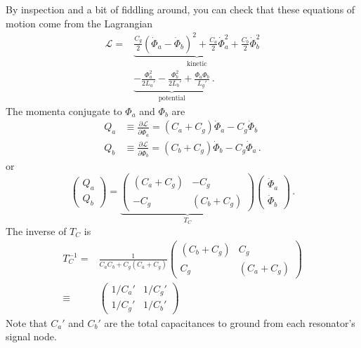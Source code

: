 \documentclass{article}
\begin{document}
By inspection and a bit of fiddling around, you can check that these equations of motion come from the Lagrangian
\begin{align}
  \mathcal{L}
  =& \underbrace{\frac{C_g}{2} \left(\dot \Phi_a - \dot \Phi_b \right)^2
   + \frac{C_a}{2} \dot \Phi_a^2 + \frac{C_b}{2} \dot \Phi_b^2}_\text{kinetic} \nonumber \\
  & \underbrace{- \frac{\Phi_a^2}{2 L_a'} - \frac{\Phi_b^2}{2 L_b'} + \frac{\Phi_a \Phi_b}{L_g'}}_\text{potential} \, .
\end{align}
The momenta conjugate to $\Phi_a$ and $\Phi_b$ are
\begin{align*}
  Q_a & \equiv \frac{\partial \mathcal{L}}{\partial \dot \Phi_a} = (C_a + C_g) \dot \Phi_a - C_g \dot \Phi_b \\
  Q_b & \equiv \frac{\partial \mathcal{L}}{\partial \dot \Phi_b} = (C_b + C_g) \dot \Phi_b - C_g \dot \Phi_a
  \, .
\end{align*}
or
\begin{equation*}
  \left( \begin{array}{c} Q_a \\ Q_b \end{array} \right)
  =
  \underbrace{
    \left( \begin{array}{cc}
       (C_a + C_g) & -C_g \\
       -C_g & (C_b + C_g) \end{array} \right)
  }_{T_C}
  \left( \begin{array}{c} \dot \Phi_a \\ \dot \Phi_b \end{array} \right)
  \, .
\end{equation*}
The inverse of $T_C$ is
\begin{align*}
  T_C^{-1} =& \frac{1}{C_a C_b + C_g (C_a + C_g)}
  \left( \begin{array}{cc}
    (C_b + C_g) & C_g \\
    C_g & (C_a + C_g)
  \end{array} \right) \\
  \equiv& \left( \begin{array}{cc}
    1 / C_a' & 1 / C_g' \\
    1 / C_g' & 1 / C_b'
  \end{array} \right)
\end{align*}
Note that $C_a'$ and $C_b'$ are the total capacitances to ground from each resonator's signal node.
\end{document}
